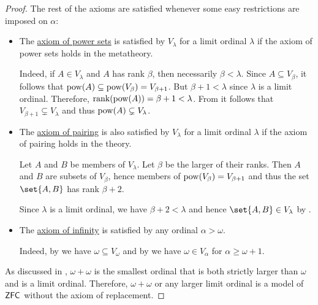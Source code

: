 \begin{proof}
  The rest of the axioms are satisfied whenever some easy restrictions are imposed on \( \alpha \):
  \begin{itemize}
    \item The \hyperref[def:zfc/power_set]{axiom of power sets} is satisfied by \( V_\lambda \) for a limit ordinal \( \lambda \) if the axiom of power sets holds in the metatheory.

    Indeed, if \( A \in V_\lambda \) and \( A \) has rank \( \beta \), then necessarily \( \beta < \lambda \). Since \( A \subseteq V_\beta \), it follows that \( \operatorname{pow}(A) \subseteq \operatorname{pow}(V_\beta) = V_{\beta + 1} \). But \( \beta + 1 < \lambda \) since \( \lambda \) is a limit ordinal. Therefore, \( \operatorname{rank}(\operatorname{pow}(A)) = \beta + 1 < \lambda \). From  it follows that \( V_{\beta + 1} \subsetneq V_\lambda \) and thus \( \operatorname{pow}(A) \subsetneq V_\lambda \).

    \item The \hyperref[def:zfc/pairing]{axiom of pairing} is also satisfied by \( V_\lambda \) for a limit ordinal \( \lambda \) if the axiom of pairing holds in the theory.

    Let \( A \) and \( B \) be members of \( V_\lambda \). Let \( \beta \) be the larger of their ranks. Then \( A \) and \( B \) are subsets of \( V_\beta \), hence members of \( \operatorname{pow}(V_\beta) = V_{\beta + 1} \) and thus the set \( \set{ A, B } \) has rank \( \beta + 2 \).

    Since \( \lambda \) is a limit ordinal, we have \( \beta + 2 < \lambda \) and hence \( \set{ A, B } \in V_\lambda \) by .

    \item The \hyperref[def:zfc/infinity]{axiom of infinity} is satisfied by any ordinal \( \alpha > \omega \).

    Indeed, by  we have \( \omega \subseteq V_\omega \) and by  we have \( \omega \in V_\alpha \) for \( \alpha \geq \omega + 1 \).
  \end{itemize}

  As discussed in , \( \omega + \omega \) is the smallest ordinal that is both strictly larger than \( \omega \) and is a limit ordinal. Therefore, \( \omega + \omega \) or any larger limit ordinal is a model of \( \textsf{ZFC} \) without the axiom of replacement.
\end{proof}

